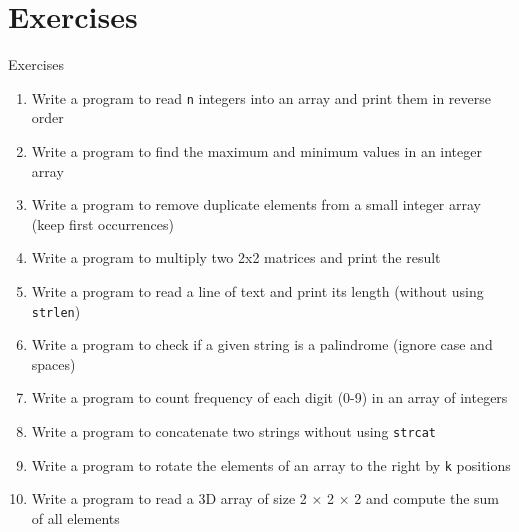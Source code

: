 \documentclass[12pt, aspectratio=169]{beamer}
\begin{document}
    \section{Exercises}


    \begin{frame}[allowframebreaks=0.75]{Exercises}
        \begin{enumerate}
            \item Write a program to read \texttt{n} integers into an array and print them in reverse order
            \item Write a program to find the maximum and minimum values in an integer array
            \item Write a program to remove duplicate elements from a small integer array (keep first occurrences)
            \item Write a program to multiply two 2x2 matrices and print the result
            \item Write a program to read a line of text and print its length (without using \texttt{strlen})
            \item Write a program to check if a given string is a palindrome (ignore case and spaces)
            \item Write a program to count frequency of each digit (0-9) in an array of integers
            \item Write a program to concatenate two strings without using \texttt{strcat}
            \item Write a program to rotate the elements of an array to the right by \texttt{k} positions
            \item Write a program to read a 3D array of size 2 × 2 × 2 and compute the sum of all elements
        \end{enumerate}
    \end{frame}
\end{document}
